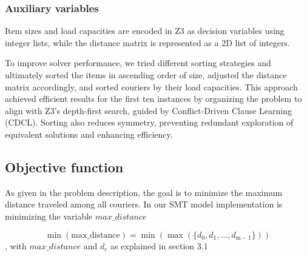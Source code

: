 \subsubsection{Auxiliary variables}

Item sizes and load capacities are encoded in Z3 as decision variables using integer lists, while the distance matrix is represented as a 2D list of integers. 

To improve solver performance, we tried different sorting strategies and ultimately sorted the items in ascending order of size, adjusted the distance matrix accordingly, and sorted couriers by their load capacities. This approach achieved efficient results for the first ten instances by organizing the problem to align with Z3’s depth-first search, guided by Conflict-Driven Clause Learning (CDCL). Sorting also reduces symmetry, preventing redundant exploration of equivalent solutions and enhancing efficiency.



\subsection{Objective function}
As given in the problem description, the goal is to minimize the maximum distance traveled among all couriers. In our SMT model implementation  is minimizing the variable $max\_distance$

\[
\min(\text{max\_distance}) = \min\left(\max\left(\{d_0, d_1, \dots, d_{\text{m}-1}\}\right)\right)
\]
, with $max\_distance$ and $d_c$ as explained in section 3.1

